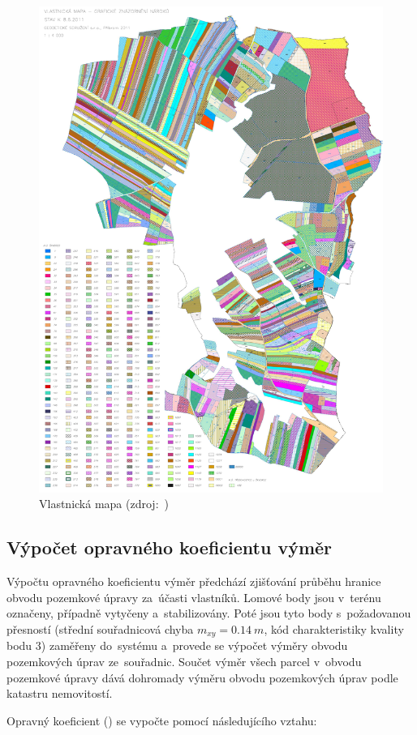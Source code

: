 	\begin{figure}[H]
		\centering
		\includegraphics[width=.8\textwidth]{./pictures/vlastnicka_mapa.pdf}
		\caption[Vlastnická mapa]{Vlastnická mapa (zdroj:~\citep{skvorec})}
		\label{fig:vlastnicka_mapa}
 	\end{figure}

\subsection{Výpočet opravného koeficientu výměr}
\label{vypocet_ok}

Výpočtu opravného koeficientu výměr předchází zjišťování průběhu hranice obvodu pozemkové úpravy za~účasti vlastníků. Lomové body jsou v~terénu označeny, případně vytyčeny a~stabilizovány. Poté jsou tyto body s~požadovanou přesností (střední souřadnicová chyba $m_{xy}=0.14~m$, kód charakteristiky kvality bodu $3$) zaměřeny do~systému  a~provede se výpočet výměry obvodu pozemkových úprav ze~souřadnic. Součet výměr všech parcel v~obvodu pozemkové úpravy dává dohromady výměru obvodu pozemkových úprav podle katastru nemovitostí.

Opravný koeficient () se vypočte pomocí následujícího vztahu:

